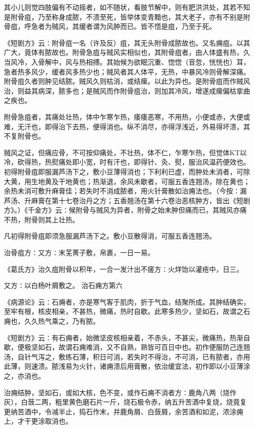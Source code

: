 \documentclass[a4paper,12pt,UTF8,twoside]{ctexbook}
\begin{document}
其小儿则觉四肢偏有不动摇者，如不随状，看肢节解中，则有肥洪洪处，其若不知是附骨疽，乃至称身成脓，不溃至死，皆举体变青黯也，其大老子，亦有不别是附骨疽，呼急者为贼风，其缓者谓为风肿而已。皆不悟是疽，乃至于死。

《短剧方》云∶附骨疽一名（许及反）疽，其无头附骨成脓故也。又名痈疽。以其广大，竟体有脓故也。附骨急疽与贼风实相似也，其附骨疽者，由人体盛有热，久当风冷，入骨解中，风与热相搏。其始候为欲眠沉重、惚惚（音忽，恍恍也）耳，急者热多风少，缓者风多热少也；贼风者其人体平，无热，中暴风冷则骨解深痛。附骨疽久者则肿见结脓。贼风久则枯消，或结瘰。以此为异也。是附骨疽而作贼风治，则益其病深，脓多也；是贼风而作附骨疽治，则加其冷风，增遂成瘰偏枯挛曲之疾也。

附骨急疽者，其痛处壮热，体中乍寒乍热，痿痿恶寒，不用热，小便或赤，大便或难，无汗也，即得治下去热，便得消也。纵不消尽，亦得浮浅近，外易得坏溃，其不复附骨也。

贼风之证，但痛应骨，不可按仰痛处，不壮热，体不仁，乍寒乍热，但觉体KT以冷，砍得热，热熨痛处即小宽，时有汗也，即得针、灸、熨，服治风温药便效也。初得附骨疽即服漏芦汤下之，敷小豆薄得消也；下利利已虚，而肿处未消者，可除大黄，用生地黄及干地黄也；热渐退，余风未歇者，可服五香连翘汤，除在黄也；余热未消可敷升麻膏佳；若失时不消成脓者，用火针膏散如治痈法也。（今按∶漏芦汤、升麻膏在第十七卷治丹之方；五香翘汤在第十六卷治恶核肿方，皆出《短剧方》。）《千金方》云∶候附骨与贼风为异者，附骨之始未肿但痛而已，其贼风亦痛不热，附骨则其上壮热。

凡初得附骨疽即须急服漏芦汤下之。敷小豆散得消，可服五香连翘汤。

治骨疽方∶又方∶末芜菁子敷，帛裹，一日一易。

《葛氏方》治久疽附骨以积年，一合一发汁出不瘥方∶火烊饴以灌疮中，日三。

又方∶以白杨叶屑敷之。
治石痈方第六

《病源论》云∶石痈者，亦是寒气客于肌肉，折于气血，结聚所成。其肿结确实，至牢有根，核皮相亲，不甚热，微痛，热时自歇。此寒多热少，坚如石，故谓之石痈也，久久热气乘之，乃有脓。

《短剧方》云∶有石痈者，始微坚皮核相亲着，不赤头，不甚尖，微痛热，热渐自歇，便极坚如石，故谓石痈难消，又不自熟，熟皆可百日中也。初作便服防己连翘汤，自针气泻之，敷练石薄，积日可消，若失时不得治，不可消，已有脓者，亦用此薄，则速溃。脓浅易为火针，诸痈溃后用膏散，依治缓宜法，初作即以小豆薄涂之，亦消也。

治痈结肿，坚如石，或如大核，色不变，或作石痈不消者方∶鹿角八两（烧作灰），白蔹二两，粗里黄色磨石片一斤，烧石极令赤，纳五升苦酒中复烧，烧竟复更纳苦酒中，令减半止，捣石作末，并鹿角屑、白蔹屑，余苦酒和如泥，浓涂痈上，才干更涂取消也。
\end{document}
